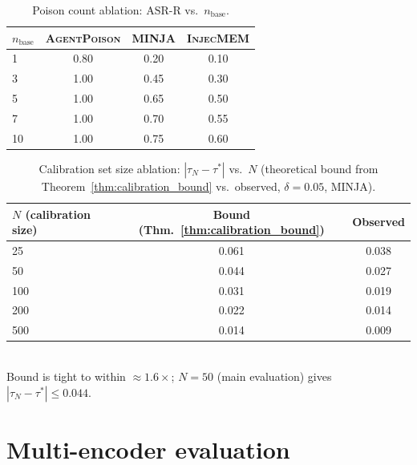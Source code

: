 \documentclass{article}
\theoremstyle{definition}
\newcommand{\asrr}{\text{ASR-R}}
\newcommand{\agentpoison}{\textsc{AgentPoison}}
\newcommand{\minja}{\textsc{MINJA}}
\newcommand{\injecmem}{\textsc{InjecMEM}}
\begin{document}
\begin{table}[ht]
  \centering
  \small
  \caption{Poison count ablation: $\asrr$ vs.\ $n_{\text{base}}$.}
  \label{tab:ablation_poison}
  \vspace{2pt}
  \begin{tabular}{lccc}
    \toprule
    $n_{\text{base}}$ & \agentpoison{} & \minja{} & \injecmem{} \\
    \midrule
    1  & 0.80 & 0.20 & 0.10 \\
    3  & 1.00 & 0.45 & 0.30 \\
    5  & 1.00 & 0.65 & 0.50 \\
    7  & 1.00 & 0.70 & 0.55 \\
    10 & 1.00 & 0.75 & 0.60 \\
    \bottomrule
  \end{tabular}
\end{table}

\begin{table}[ht]
  \centering
  \small
  \caption{Calibration set size ablation: $|\tau_N - \tau^*|$ vs.\ $N$ (theoretical bound from Theorem~\ref{thm:calibration_bound} vs.\ observed, $\delta=0.05$, \minja{}).}
  \label{tab:ablation_calibration}
  \vspace{2pt}
  \begin{tabular}{l cc}
    \toprule
    $N$ (calibration size) & Bound (Thm.~\ref{thm:calibration_bound}) & Observed \\
    \midrule
    25  & 0.061 & 0.038 \\
    50  & 0.044 & 0.027 \\
    100 & 0.031 & 0.019 \\
    200 & 0.022 & 0.014 \\
    500 & 0.014 & 0.009 \\
    \bottomrule
  \end{tabular}
  \\[2pt]
  {\footnotesize Bound is tight to within $\approx 1.6\times$; $N=50$ (main evaluation) gives $|\tau_N - \tau^*| \leq 0.044$.}
\end{table}

\section{Multi-encoder evaluation}
\label{app:encoder_gen}
\end{document}
